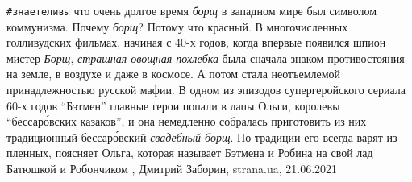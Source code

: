 \verb|#знаетеливы| что очень долгое время \emph{борщ} в западном мире был
символом коммунизма. Почему \emph{борщ}? Потому что красный. В многочисленных
голливудских фильмах, начиная с 40-х годов, когда впервые появился шпион мистер
\emph{Борщ}, \emph{страшная овощная похлебка} была сначала знаком
противостояния на земле, в воздухе и даже в космосе. А потом стала неотъемлемой
принадлежностью русской мафии.  В одном из эпизодов супергеройского сериала
60-х годов \enquote{Бэтмен} главные герои попали в лапы Ольги, королевы
\enquote{бессаро́вских казаков}, и она немедленно собралась приготовить из них
традиционный бессаро́вский \emph{свадебный борщ}. По традиции его всегда варят
из пленных, поясняет Ольга, которая называет Бэтмена и Робина на свой лад
Батюшкой и Робончиком
, 
Дмитрий Заборин, strana.ua, 21.06.2021
